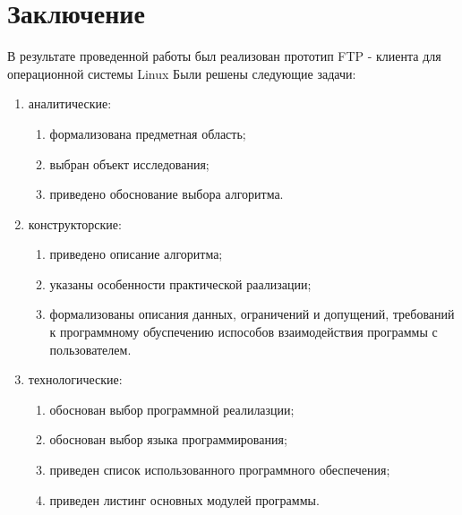 \section{Заключение}
В результате проведенной работы был реализован прототип FTP - клиента для операционной системы Linux
Были решены следующие задачи:
\begin{enumerate}
	\item аналитические:
	\begin{enumerate}
		\item формализована предметная область; 
		\item выбран объект исследования;
		\item приведено обоснование выбора алгоритма.
	\end{enumerate}
	\item конструкторские: \begin{enumerate}
		\item приведено описание алгоритма;
		\item указаны особенности практической раализации;
		\item формализованы описания данных, ограничений и допущений, требований к программному обуспечению испособов взаимодействия программы с пользователем.
	\end{enumerate}
	\item технологические: \begin{enumerate}
		\item обоснован выбор программной реалилазции;
		\item обоснован выбор языка программирования;
		\item приведен список использованного программного обеспечения;
		\item приведен листинг основных модулей программы.
	\end{enumerate}
\end{enumerate}